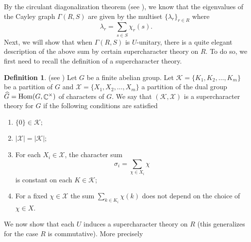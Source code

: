 \documentclass[12pt, a4paper]{amsart}
\theoremstyle{definition}
\newtheorem{definition}[thm]{Definition}
\DeclareMathOperator{\C}{\mathbb{C}}
\DeclareMathOperator{\Hom}{{\rm Hom}}
\numberwithin{equation}{section}
\begin{document}
By the circulant diagonalization theorem (see \cite{kanemitsu2013matrices}), we know that the eigenvalues of the Cayley graph $\Gamma(R,S)$ are given by the multiset $\{\lambda_r\}_{r \in R}$ where 
\[ \lambda_r = \sum_{s \in S} \chi_{r}(s).\]
Next, we will show that when $\Gamma(R,S)$ is $U$-unitary, there is a quite elegant description of the above sum by certain supercharacter theory on $R.$
To do so, we first need to recall the definition of a supercharacter theory. 
\begin{definition} (see \cite[Definition 2.1]{nguyen2025supercharacters}) \label{def:supercharacter}
    Let $G$ be a finite abelian group. Let $\mathcal{K}=\{K_1, K_2, \ldots, K_m\}$ be a partition of $G$ and $\mathcal{X} =\{X_1, X_2, \ldots, X_m \}$ a partition of the dual group $\widehat{G}=\Hom(G, \C^{\times})$ of characters of $G$. We say that $(\mathcal{K}, \mathcal{X})$ is a supercharacter theory for  $G$ if the following conditions are satisfied 
    \begin{enumerate}
        \item $\{0 \} \in \mathcal{K};$
        \item $|\mathcal{X}| = |\mathcal{K}|;$
        \item For each $X_i \in \mathcal{X}$, the character sum 
        \[ \sigma_i = \sum_{\chi \in X_i} \chi\]
        is constant on each $K \in \mathcal{K}$;
    \item For a  fixed $\chi \in \mathcal{X}$ the sum $\sum_{k \in K_i} \chi(k)$ does not depend on the choice of $\chi \in X.$ 

    \end{enumerate}
\end{definition}
We now show that each $U$ induces a supercharacter theory on $R$ (this generalizes \cite[Theorem 4.1]{nguyen2025supercharacters} for the case $R$ is commutative). More precisely  
\end{document}
